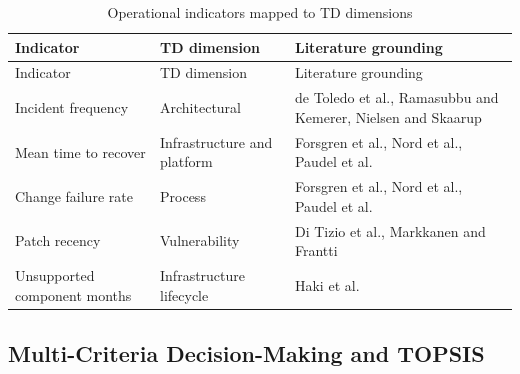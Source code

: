 \documentclass[
  authoryear,
  preprint]{elsarticle}
\begin{document}
\begin{longtable}[]{@{}
  >{\raggedright\arraybackslash}p{}
  >{\raggedright\arraybackslash}p{}
  >{\raggedright\arraybackslash}p{}@{}}
\caption{Operational indicators mapped to TD
dimensions}\label{tbl-indicators-lit}\tabularnewline
\toprule\noalign{}
\begin{minipage}[b]{\linewidth}\raggedright
Indicator
\end{minipage} & \begin{minipage}[b]{\linewidth}\raggedright
TD dimension
\end{minipage} & \begin{minipage}[b]{\linewidth}\raggedright
Literature grounding
\end{minipage} \\
\midrule\noalign{}
\endfirsthead
\toprule\noalign{}
\begin{minipage}[b]{\linewidth}\raggedright
Indicator
\end{minipage} & \begin{minipage}[b]{\linewidth}\raggedright
TD dimension
\end{minipage} & \begin{minipage}[b]{\linewidth}\raggedright
Literature grounding
\end{minipage} \\
\midrule\noalign{}
\endhead
\bottomrule\noalign{}
\endlastfoot
Incident frequency & Architectural & de Toledo et al., Ramasubbu and
Kemerer, Nielsen and Skaarup \\
Mean time to recover & Infrastructure and platform & Forsgren et al.,
Nord et al., Paudel et al. \\
Change failure rate & Process & Forsgren et al., Nord et al., Paudel et
al. \\
Patch recency & Vulnerability & Di Tizio et al., Markkanen and
Frantti \\
Unsupported component months & Infrastructure lifecycle & Haki et al. \\
\end{longtable}

\subsection{Multi-Criteria Decision-Making and
TOPSIS}\label{multi-criteria-decision-making-and-topsis}
\end{document}
